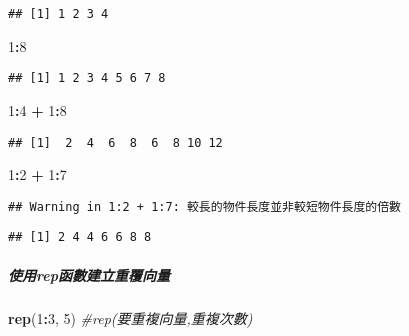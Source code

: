 \documentclass[
]{article}
\newenvironment{Shaded}{\begin{snugshade}}{\end{snugshade}}
\newcommand{\CommentTok}[1]{\textcolor[rgb]{0.56,0.35,0.01}{\textit{#1}}}
\newcommand{\DecValTok}[1]{\textcolor[rgb]{0.00,0.00,0.81}{#1}}
\newcommand{\KeywordTok}[1]{\textcolor[rgb]{0.13,0.29,0.53}{\textbf{#1}}}
\newcommand{\NormalTok}[1]{#1}
\newcommand{\OperatorTok}[1]{\textcolor[rgb]{0.81,0.36,0.00}{\textbf{#1}}}
\newcommand{\StringTok}[1]{\textcolor[rgb]{0.31,0.60,0.02}{#1}}
\begin{document}
\begin{verbatim}
## [1] 1 2 3 4
\end{verbatim}

\begin{Shaded}
\begin{Highlighting}[]
\DecValTok{1}\OperatorTok{:}\DecValTok{8}
\end{Highlighting}
\end{Shaded}

\begin{verbatim}
## [1] 1 2 3 4 5 6 7 8
\end{verbatim}

\begin{Shaded}
\begin{Highlighting}[]
\DecValTok{1}\OperatorTok{:}\DecValTok{4} \OperatorTok{+}\StringTok{ }\DecValTok{1}\OperatorTok{:}\DecValTok{8}
\end{Highlighting}
\end{Shaded}

\begin{verbatim}
## [1]  2  4  6  8  6  8 10 12
\end{verbatim}

\begin{Shaded}
\begin{Highlighting}[]
\DecValTok{1}\OperatorTok{:}\DecValTok{2} \OperatorTok{+}\StringTok{ }\DecValTok{1}\OperatorTok{:}\DecValTok{7}
\end{Highlighting}
\end{Shaded}

\begin{verbatim}
## Warning in 1:2 + 1:7: 較長的物件長度並非較短物件長度的倍數
\end{verbatim}

\begin{verbatim}
## [1] 2 4 4 6 6 8 8
\end{verbatim}

\hypertarget{ux4f7fux7528repux51fdux6578ux5efaux7acbux91cdux8986ux5411ux91cf}{%
\subparagraph{使用rep函數建立重覆向量}\label{ux4f7fux7528repux51fdux6578ux5efaux7acbux91cdux8986ux5411ux91cf}}

\begin{Shaded}
\begin{Highlighting}[]
\KeywordTok{rep}\NormalTok{(}\DecValTok{1}\OperatorTok{:}\DecValTok{3}\NormalTok{, }\DecValTok{5}\NormalTok{)  }\CommentTok{#rep(要重複向量,重複次數)}
\end{Highlighting}
\end{Shaded}
\end{document}
